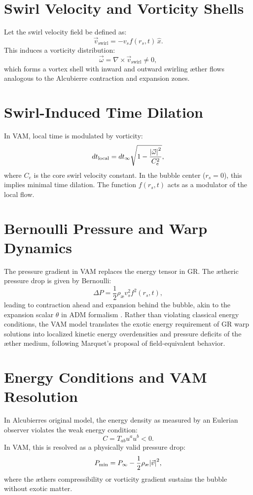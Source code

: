 \documentclass[12pt]{article}
\begin{document}
\section{Swirl Velocity and Vorticity Shells}
Let the swirl velocity field be defined as:
\begin{equation}
    \vec{v}_{\text{swirl}} = -v_s f(r_s, t)\, \hat{x}.
\end{equation}
This induces a vorticity distribution:
\begin{equation}
    \vec{\omega} = \nabla \times \vec{v}_{\text{swirl}} \neq 0,
\end{equation}
which forms a vortex shell with inward and outward swirling æther flows analogous to the Alcubierre contraction and expansion zones.

\section{Swirl-Induced Time Dilation}
In VAM, local time is modulated by vorticity:
\begin{equation}
    dt_{\text{local}} = dt_{\infty} \sqrt{1 - \frac{\abs{\vec{\omega}}^2}{C_e^2}},
\end{equation}
where \( C_e \) is the core swirl velocity constant. In the bubble center (\( r_s = 0 \)), this implies minimal time dilation. The function \( f(r_s, t) \) acts as a modulator of the local flow.

\section{Bernoulli Pressure and Warp Dynamics}
The pressure gradient in VAM replaces the energy tensor in GR. The ætheric pressure drop is given by Bernoulli:
\begin{equation}
    \Delta P = \frac{1}{2} \rho_\text{\ae} v_s^2 f^2(r_s, t),
\end{equation}
leading to contraction ahead and expansion behind the bubble, akin to the expansion scalar \( \theta \) in ADM formalism \cite{marquet2009warp}.
Rather than violating classical energy conditions, the VAM model translates the exotic energy requirement of GR warp solutions into localized kinetic energy overdensities and pressure deficits of the æther medium, following Marquet's proposal of field-equivalent behavior.

\section{Energy Conditions and VAM Resolution}
In Alcubierre\rqs s original model, the energy density as measured by an Eulerian observer violates the weak energy condition:
\begin{equation}
    C = T_{ab} u^a u^b < 0.
\end{equation}
In VAM, this is resolved as a physically valid pressure drop:
\begin{equation}
    P_{\text{min}} = P_\infty - \frac{1}{2} \rho_\text{\ae} \abs{\vec{v}}^2,
\end{equation}
where the æther\rqs s compressibility or vorticity gradient sustains the bubble without exotic matter.
\end{document}
